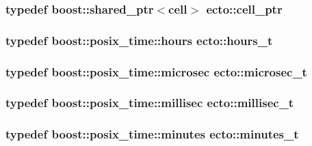 \subsubsection[{cell\+\_\+ptr}]{\setlength{\rightskip}{0pt plus 5cm}typedef boost\+::shared\+\_\+ptr$<${\bf cell}$>$ {\bf ecto\+::cell\+\_\+ptr}}\label{namespaceecto_aed1809e82b9229ea81ef9ee3438cf62c}
\hypertarget{namespaceecto_a477c167c1e1288b689db5872f650540e}{}
\subsubsection[{hours\+\_\+t}]{\setlength{\rightskip}{0pt plus 5cm}typedef boost\+::posix\+\_\+time\+::hours {\bf ecto\+::hours\+\_\+t}}\label{namespaceecto_a477c167c1e1288b689db5872f650540e}
\hypertarget{namespaceecto_affe36dc8be6d20a6b8f7359655c8dc23}{}
\subsubsection[{microsec\+\_\+t}]{\setlength{\rightskip}{0pt plus 5cm}typedef boost\+::posix\+\_\+time\+::microsec {\bf ecto\+::microsec\+\_\+t}}\label{namespaceecto_affe36dc8be6d20a6b8f7359655c8dc23}
\hypertarget{namespaceecto_ab1f4721cc3b311f9615b3092d291260b}{}
\subsubsection[{millisec\+\_\+t}]{\setlength{\rightskip}{0pt plus 5cm}typedef boost\+::posix\+\_\+time\+::millisec {\bf ecto\+::millisec\+\_\+t}}\label{namespaceecto_ab1f4721cc3b311f9615b3092d291260b}
\hypertarget{namespaceecto_ad57e5ebf1455dd895ce11804e47669e5}{}
\subsubsection[{minutes\+\_\+t}]{\setlength{\rightskip}{0pt plus 5cm}typedef boost\+::posix\+\_\+time\+::minutes {\bf ecto\+::minutes\+\_\+t}}\label{namespaceecto_ad57e5ebf1455dd895ce11804e47669e5}
\hypertarget{namespaceecto_a5a9973f00c94e30353acb27c3d2fa836}{}
